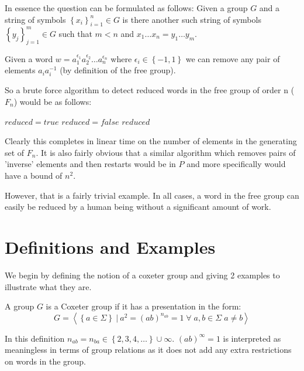 \documentclass[a4paper,12pt]{article}
\begin{document}
In essence the question can be formulated as follows:
Given a group $G$ and a string of symbols $\left\{x_i\right\}_{i=1}^n \in G$ is there another such string of symbols $\left\{y_j\right\}_{j=1}^m \in G$ such that $m < n$ and $x_1 \ldots x_n = y_1 \ldots y_m$. 

Given a word $w = a_1^{\epsilon_1} a_2^{\epsilon_2} \ldots a_n^{\epsilon_n}$ where $\epsilon_i \in \left\{-1, 1 \right\}$ we can remove any pair of elements $a_i a_i^{-1}$ (by definition of the free group).

So a brute force algorithm to detect reduced words in the free group of order n ($F_n$) would be as follows:
\begin{algorithmic}[1]
	\STATE $reduced = true$
			\STATE $reduced = false$
		\ENDIF
	\ENDFOR
	\RETURN $reduced$
\end{algorithmic}

Clearly this completes in linear time on the number of elements in the generating set of $F_n$. It is also fairly obvious that a similar algorithm which removes pairs of 'inverse' elements and then restarts would be in $P$ and more specifically would have a bound of $n^2$.

However, that is a fairly trivial example. In all cases, a word in the free group can easily be reduced by a human being without a significant amount of work.

\section{Definitions and Examples}

We begin by defining the notion of a coxeter group and giving 2 examples to illustrate what they are.

\begin{definition}
A group $G$ is a Coxeter group if it has a presentation in the form:
\begin{equation}
	G = \left\langle \left\{a \in \Sigma \right\} \: | \: a^2 = (ab)^{n_{ab}} = 1 \; \forall \; a, b \in \Sigma \; a \neq b\right\rangle
\end{equation}

In this definition $n_{ab} = n_{ba} \in \left\{2,3,4,\ldots\right\} \cup \infty$. $\left(ab\right)^{\infty} = 1$ is interpreted as meaningless in terms of group relations as it does not add any extra restrictions on words in the group.
\end{definition}
\end{document}
